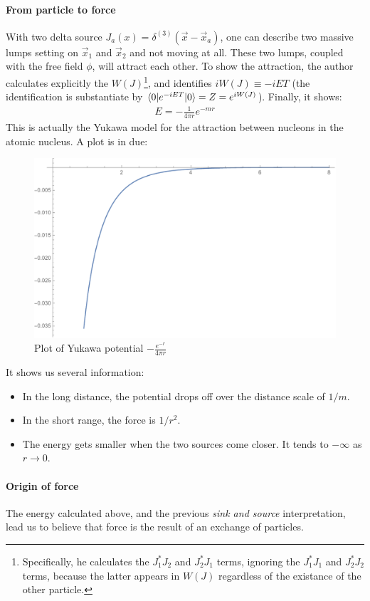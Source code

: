 \documentclass{book}
\numberwithin{equation}{subsection} %
\theoremstyle{definition}
\begin{document}
\paragraph{From particle to force}
With two delta source $J_a(x)=\delta^{(3)}(\vec{x}-\vec{x}_a)$, one can
describe two massive lumps setting on $\vec{x}_1$ and $\vec{x}_2$ and
not moving at all. These two lumps, coupled with the free field $\phi$,
will attract each other. To show the attraction, the author calculates
explicitly the $W(J)$\footnote{
    Specifically, he calculates the $J^*_1J_2$ and $J^*_2J_1$ terms,
    ignoring the $J^*_1J_1$ and $J^*_2J_2$ terms, because the latter
    appears in $W(J)$ regardless of the existance of the other particle.
}, and identifies $iW(J) \equiv -iET$ (the
identification is substantiate by $\braket{0|e^{-iET}|0} = Z = e^{iW(J)}$).
Finally, it shows:
\begin{align}
    E= -\frac{1}{4\pi r}e^{-mr}
\end{align}
This is actually the Yukawa model for the attraction between nucleons
in the atomic nucleus. A plot is in due:
\begin{figure}[H]
    \centering
    \includegraphics[width=0.8\linewidth]{pics/Yukawa-potential.pdf}
    \caption{Plot of Yukawa potential $-\frac{e^{-r}}{4 \pi  r}$}
\end{figure}

It shows us several information:
\begin{itemize}
    \item In the long distance, the potential drops off over the
        distance scale of $1/m$.
    \item In the short range, the force is $1/r^2$.
    \item The energy gets smaller when the two sources come closer.
        It tends to $-\infty$ as $r\to 0$.
\end{itemize}

\paragraph{Origin of force}
The energy calculated above, and the previous \textit{sink and source}
interpretation, lead us to believe that force is the result of an
exchange of particles.
\end{document}
